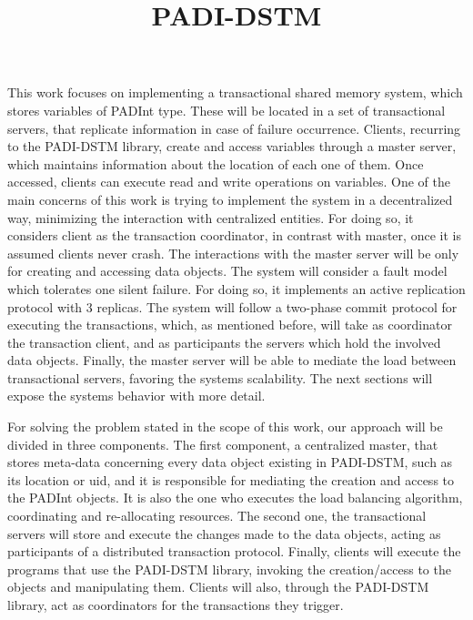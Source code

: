 \documentclass[times, 10pt,twocolumn]{article}
\begin{document}
\title{PADI-DSTM}



\maketitle
\thispagestyle{empty}






This work focuses on implementing a transactional shared memory system, which stores variables of PADInt type. These will be located in a set of transactional servers, that replicate information in case of failure occurrence. Clients, recurring to the PADI-DSTM library, create and access variables through a master server, which maintains information about the location of each one of them. Once accessed, clients can execute read and write operations on variables. One of the main concerns of this work is trying to implement the system in a decentralized way, minimizing the interaction with centralized entities. For doing so, it considers client as the transaction coordinator, in contrast with master, once it is assumed clients never crash. The interactions with the master server will be only for creating and accessing data objects. The system will consider a fault model which tolerates one silent failure. For doing so, it implements an active replication protocol with 3 replicas. The system will follow a two-phase commit protocol for executing the transactions, which, as mentioned before, will take as coordinator the transaction client, and as participants the servers which hold the involved data objects. Finally, the master server will be able to mediate the load between transactional servers, favoring the systems scalability. The next sections will expose the systems behavior with more detail.  




For solving the problem stated in the scope of this work, our approach will be divided in three components.
The first component, a centralized master, that stores meta-data concerning every data object existing in PADI-DSTM, such as its location or uid, and it is responsible for mediating the creation and access to the PADInt objects. It is also the one who executes the load balancing algorithm, coordinating and re-allocating resources. The second one, the transactional servers will store and execute the changes made to the data objects, acting as participants of a distributed transaction protocol. Finally, clients will execute the programs that use the PADI-DSTM library, invoking the creation/access to the objects and manipulating them. Clients will also, through the PADI-DSTM library, act as coordinators for the transactions they trigger. 
\end{document}
